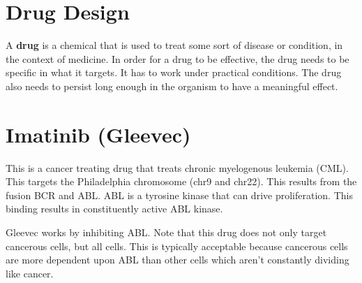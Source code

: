 \documentclass{article}
\begin{document}
\section{Drug Design}

A \textbf{drug} is a chemical that is used to treat some sort of disease or
condition, in the context of medicine. In order for a drug to be effective, the
drug needs to be specific in what it targets. It has to work under practical
conditions. The drug also needs to persist long enough in the organism to have a
meaningful effect.

\section{Imatinib (Gleevec)}

This is a cancer treating drug that treats chronic myelogenous leukemia (CML).
This targets the Philadelphia chromosome (chr9 and chr22). This results from the
fusion BCR and ABL. ABL is a tyrosine kinase that can drive proliferation. This
binding results in constituently active ABL kinase.

Gleevec works by inhibiting ABL. Note that this drug does not only target
cancerous cells, but all cells. This is typically acceptable because cancerous
cells are more dependent upon ABL than other cells which aren't constantly
dividing like cancer.
\end{document}
